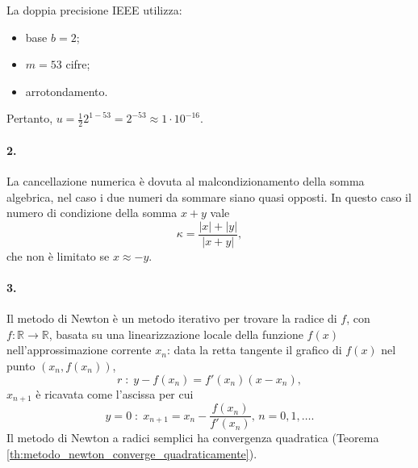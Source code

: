 \noindent La doppia precisione IEEE utilizza:
\begin{itemize}
    \item base $b=2$;
    \item $m=53$ cifre;
    \item arrotondamento.
\end{itemize}
Pertanto, $u=\frac{1}{2}2^{1-53}=2^{-53}\approx 1\cdot 10^{-16}$.

\paragraph{2.}
La cancellazione numerica è dovuta al malcondizionamento della somma algebrica, nel caso i due numeri da sommare siano quasi opposti. In questo caso il numero di condizione della somma $x+y$ vale
\begin{equation*}
    \kappa=\frac{|x|+|y|}{|x+y|},
\end{equation*}
che non è limitato se $x\approx -y$.

\paragraph{3.} Il metodo di Newton è un metodo iterativo per trovare la radice di $f$, con $f:\mathbb R\rightarrow\mathbb R$, basata su una linearizzazione locale della funzione $f(x)$ nell'approssimazione corrente $x_n$: data la retta tangente il grafico di $f(x)$ nel punto $(x_n, f(x_n))$, 
\begin{equation*}
    r\;:\;y-f(x_n)=f'(x_n)(x-x_n),
\end{equation*}
$x_{n+1}$ è ricavata come l'ascissa per cui
\begin{equation*}
    y=0\;:\;x_{n+1}=x_n-\frac{f(x_n)}{f'(x_n)},\, n=0,1,\hdots.
\end{equation*}
Il metodo di Newton a radici semplici ha convergenza quadratica (Teorema \ref{th:metodo_newton_converge_quadraticamente}).

